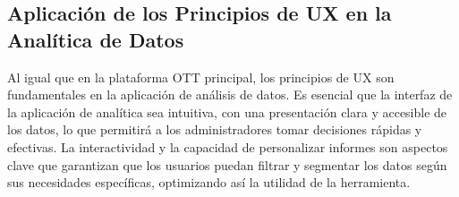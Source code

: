 \subsection{Aplicación de los Principios de UX en la Analítica de Datos}
\label{subsec:fundamentos_ux_analitica}

Al igual que en la plataforma OTT principal, los principios de UX son fundamentales en la aplicación de análisis de datos. 
Es esencial que la interfaz de la aplicación de analítica sea intuitiva, con una presentación clara y accesible de los datos, 
lo que permitirá a los administradores tomar decisiones rápidas y efectivas. La interactividad y la capacidad de personalizar 
informes son aspectos clave que garantizan que los usuarios puedan filtrar y segmentar los datos según sus necesidades 
específicas, optimizando así la utilidad de la herramienta.
